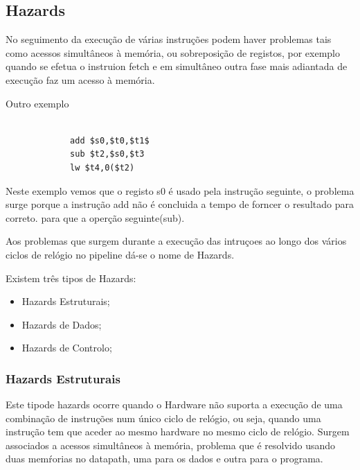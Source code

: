 \documentclass[10pt,a4paper]{book}
\begin{document}
		\subsection{Hazards}
			No seguimento da execução de várias instruções podem haver problemas tais como acessos simultâneos à memória, ou sobreposição de registos, por exemplo quando se efetua o instruion fetch e em simultâneo outra fase mais adiantada de execução faz um acesso à memória.

			Outro exemplo

			\begin{lstlisting}

			 add $s0,$t0,$t1$
			 sub $t2,$s0,$t3
			 lw $t4,0($t2)

			\end{lstlisting}

			Neste exemplo vemos que o registo s0  é usado pela instrução seguinte, o problema surge porque a instrução add não é concluida a tempo de forncer o resultado para correto. para que a operção seguinte(sub).

			Aos problemas que surgem durante a execução das intruçoes ao longo dos vários ciclos de relógio no pipeline dá-se o nome de Hazards.

			Existem três tipos de Hazards:

			\begin{itemize}
				\item Hazards Estruturais;
				\item Hazards de Dados;
				\item Hazards de Controlo;
			\end{itemize}

		\subsubsection{Hazards Estruturais}

			Este tipode hazards ocorre quando o Hardware não suporta a execução de uma combinação de instruções num único ciclo de relógio, ou seja, quando uma instrução tem que aceder ao mesmo hardware no mesmo ciclo de relógio. Surgem associados a acessos simultâneos à memória, problema que é resolvido usando duas memŕorias no datapath, uma para os dados e outra para o programa.
\end{document}

